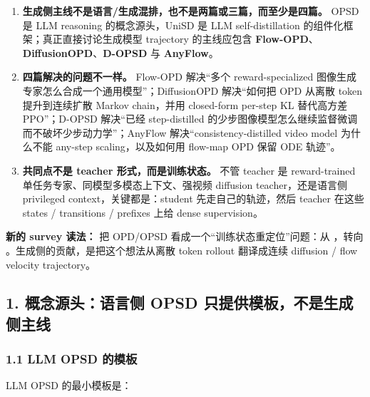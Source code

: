 \begin{enumerate}[leftmargin=1.5em]
  \item \textbf{生成侧主线不是语言/生成混排，也不是两篇或三篇，而至少是四篇。} OPSD 是 LLM reasoning 的概念源头，UniSD 是 LLM self-distillation 的组件化框架；真正直接讨论生成模型 trajectory 的主线应包含 \textbf{Flow-OPD}、\textbf{DiffusionOPD}、\textbf{D-OPSD} 与 \textbf{AnyFlow}。
  \item \textbf{四篇解决的问题不一样。} Flow-OPD 解决“多个 reward-specialized 图像生成专家怎么合成一个通用模型”；DiffusionOPD 解决“如何把 OPD 从离散 token 提升到连续扩散 Markov chain，并用 closed-form per-step KL 替代高方差 PPO”；D-OPSD 解决“已经 step-distilled 的少步图像模型怎么继续监督微调而不破坏少步动力学”；AnyFlow 解决“consistency-distilled video model 为什么不能 any-step scaling，以及如何用 flow-map OPD 保留 ODE 轨迹”。
  \item \textbf{共同点不是 teacher 形式，而是训练状态。} 不管 teacher 是 reward-trained 单任务专家、同模型多模态上下文、强视频 diffusion teacher，还是语言侧 privileged context，关键都是：student 先走自己的轨迹，然后 teacher 在这些 states / transitions / prefixes 上给 dense supervision。
\end{enumerate}

\begin{summarybox}
\textbf{新的 survey 读法：} 把 OPD/OPSD 看成一个“训练状态重定位”问题：从 ，转向 。生成侧的贡献，是把这个想法从离散 token rollout 翻译成连续 diffusion / flow velocity trajectory。
\end{summarybox}

\subsection{1. 概念源头：语言侧 OPSD 只提供模板，不是生成侧主线}

\subsubsection{1.1 LLM OPSD 的模板}

LLM OPSD 的最小模板是：

